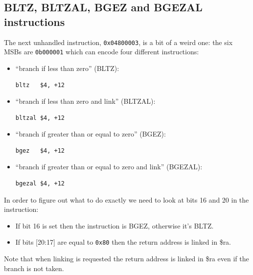 \documentclass[a4paper]{article}
\newcommand{\code}[1] {\texttt{#1}}
\begin{document}
\subsection{BLTZ, BLTZAL, BGEZ and BGEZAL instructions}

The next unhandled instruction, \code{0x04800003}, is a bit of a weird
one: the six MSBs are \code{0b000001} which can encode four different
instructions:

\begin{itemize}
\item ``branch if less than zero'' (BLTZ):

  \begin{lstlisting}[language=assembly]
bltz   $4, +12
  \end{lstlisting}

\item ``branch if less than zero and link'' (BLTZAL):

  \begin{lstlisting}[language=assembly]
bltzal $4, +12
  \end{lstlisting}

\item ``branch if greater than or equal to zero'' (BGEZ):
  \begin{lstlisting}[language=assembly]
bgez   $4, +12
  \end{lstlisting}


\item ``branch if greater than or equal to zero and link'' (BGEZAL):

  \begin{lstlisting}[language=assembly]
bgezal $4, +12
  \end{lstlisting}

\end{itemize}

In order to figure out what to do exactly we need to look at bits 16
and 20 in the instruction:

\begin{itemize}
\item If bit 16 is set then the instruction is BGEZ, otherwise it's
  BLTZ.

\item If bits [20:17] are equal to \code{0x80} then the return address
  is linked in \$ra.
\end{itemize}

Note that when linking is requested the return address is linked in
\$ra even if the branch is not taken.
\end{document}
